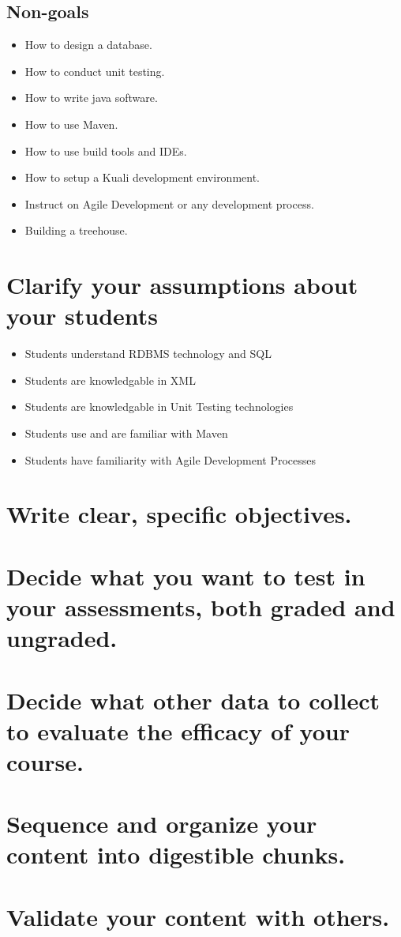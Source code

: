 \documentclass[12pt,notitlepage]{article}
\begin{document}
\subsection{Non-goals}
\begin{itemize}
\item How to design a database.
\item How to conduct unit testing.
\item How to write java software. 
\item How to use Maven.
\item How to use build tools and IDEs.
\item How to setup a Kuali development environment.
\item Instruct on Agile Development or any development process.
\item Building a treehouse.
\end{itemize}

\section{Clarify your assumptions about your students}
\begin{itemize}
\item Students understand RDBMS technology and SQL
\item Students are knowledgable in XML
\item Students are knowledgable in Unit Testing technologies
\item Students use and are familiar with Maven
\item Students have familiarity with Agile Development Processes
\end{itemize}

\section{Write clear, specific objectives.}

\section{Decide what you want to test in your assessments, both graded and ungraded.}

\section{Decide what other data to collect to evaluate the efficacy of your course.}

\section{Sequence and organize your content into digestible chunks.}

\section{Validate your content with others.}
\end{document}
